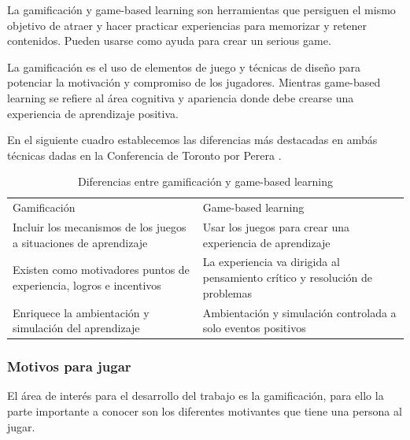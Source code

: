 La gamificación y game-based learning son herramientas que persiguen el mismo objetivo de atraer y hacer practicar experiencias para memorizar y retener contenidos. Pueden usarse como ayuda para crear un serious game.

La gamificación es el uso de elementos de juego y técnicas de diseño para potenciar la motivación y compromiso de los jugadores. Mientras game-based learning se refiere al área cognitiva y apariencia donde debe crearse una experiencia de aprendizaje positiva.

En el siguiente cuadro\cite{gabale} establecemos las diferencias más destacadas en ambás técnicas dadas en la Conferencia de Toronto por Perera \cite{jorgepereragonzález2016}.

\begin{table}[htbp]
	\centering
	\caption{Diferencias entre gamificación y game-based learning}
	\label{gabale}
	\begin{tabular}{ll}
		Gamificación                                                        & Game-based learning                                                         \\
		Incluir los mecanismos de los juegos a situaciones de aprendizaje   & Usar los juegos para crear una experiencia de aprendizaje                   \\
		Existen como motivadores puntos de experiencia, logros e incentivos & La experiencia va dirigida al pensamiento crítico y resolución de problemas \\
		Enriquece la ambientación y simulación del aprendizaje              & Ambientación y simulación controlada a solo eventos positivos              
	\end{tabular}
\end{table}

\subsubsection{Motivos para jugar}
El área de interés para el desarrollo del trabajo es la gamificación, para ello la parte importante a conocer son los diferentes motivantes que tiene una persona al jugar.


